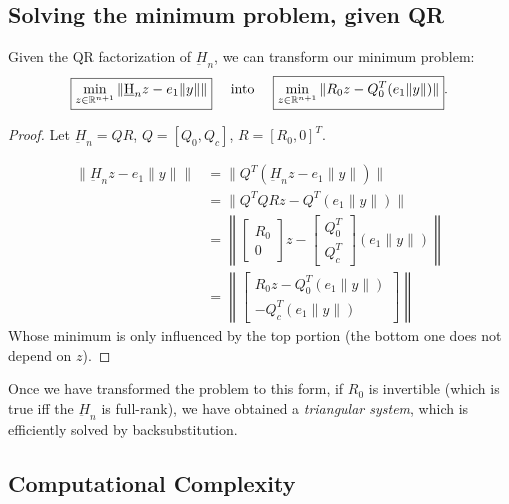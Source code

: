 \documentclass{article}
\newcommand{\reals}{\mathbb R}
\newcommand{\hess}{\underbar H}
\begin{document}
  \subsection{Solving the minimum problem, given QR}
  Given the QR factorization of $\underbar H_n$, we can transform our minimum problem:
  \[\boxed{\min_{z \in \reals^{n+1}} \|\hess_n z - e_1\|y\|\|}
  \text{ \quad into \quad }\boxed{\min_{z \in \reals^{n+1}} \|R_0 z - Q_0^T (e_1 \|y\|)\|}.\]
  \begin{proof} Let $\underbar H_n = QR$, \quad $Q = [Q_0, Q_c]$, \quad $R = [R_0, 0]^T$.
  
  \begingroup
\addtolength{\jot}{.5em}
   \begin{align}
     \|\hess_n z - e_1\|y\|\| &= \|Q^T (\hess_n z - e_1\|y\|)\| \tag{$Q^T$ is norm-preserving}\\
     &= \|Q^TQRz - Q^T( e_1\|y\|)\| \tag{QR factorization of $\underbar H_n$}\\
     &= \left \| \begin{bmatrix}R_0 \\ 0\end{bmatrix} z - \begin{bmatrix}Q_0^T \\ Q_c^T\end{bmatrix} ( e_1\|y\|) \right \| \tag{assumption}\\
     &= \left \|\begin{bmatrix}
         R_0 z - Q_0^T ( e_1\|y\|)\\
         -Q_c^T (e_1\|y\|)
        \end{bmatrix}\right \| \tag{vector algebra}
   \end{align}
   Whose minimum is only influenced by the top portion (the bottom one does not depend on $z$).
\endgroup
  \end{proof}
\noindent Once we have transformed the problem to this form, if $R_0$ is invertible (which is true iff the $\underbar H_n$ is full-rank), we have obtained a \emph{triangular system}, which is efficiently solved by backsubstitution.

\subsection{Computational Complexity}
\end{document}
